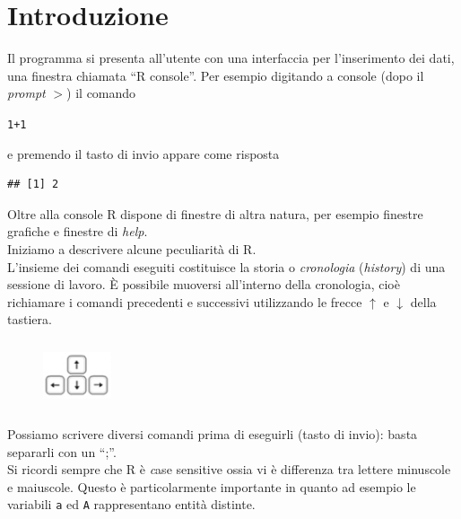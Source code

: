 \documentclass[onecolumn,11pt]{book}\usepackage[]{graphicx}\usepackage[]{color}
\makeatletter
\newcommand{\hlnum}[1]{\textcolor[rgb]{0.686,0.059,0.569}{#1}}%
\newcommand{\hlopt}[1]{\textcolor[rgb]{0,0,0}{#1}}%
\newenvironment{kframe}{%
 \def\at@end@of@kframe{}%
 \ifinner\ifhmode%
  \def\at@end@of@kframe{\end{minipage}}%
  \begin{minipage}{\columnwidth}%
 \fi\fi%
 \def\FrameCommand##1{\hskip\@totalleftmargin \hskip-\fboxsep
 \colorbox{shadecolor}{##1}\hskip-\fboxsep
     \hskip-\linewidth \hskip-\@totalleftmargin \hskip\columnwidth}%
 \MakeFramed {\advance\hsize-\width
   \@totalleftmargin\z@ \linewidth\hsize
   \@setminipage}}%
 {\par\unskip\endMakeFramed%
 \at@end@of@kframe}
\newenvironment{knitrout}{}{} %
\makeatother
\begin{document}
\section{Introduzione}
Il programma si presenta all'utente con una interfaccia per l'inserimento dei dati, una finestra chiamata ``\textsf{R} console''. Per esempio digitando a console (dopo il \textit{prompt} $>$) il comando
\begin{knitrout}
\color{fgcolor}\begin{kframe}
\begin{alltt}
\hlnum{1}\hlopt{+}\hlnum{1}
\end{alltt}
\end{kframe}
\end{knitrout}
e premendo il tasto di invio appare come risposta
\begin{knitrout}
\color{fgcolor}\begin{kframe}
\begin{verbatim}
## [1] 2
\end{verbatim}
\end{kframe}
\end{knitrout}
Oltre alla console
\textsf{R} dispone di finestre di altra natura, per esempio finestre grafiche e finestre di {\it help}.
\\
Iniziamo a descrivere alcune peculiarit\`a di \textsf{R}.\\
L'insieme dei comandi eseguiti costituisce la storia o \textit{cronologia} (\textit{history}) 
 di una sessione di lavoro. \`E possibile muoversi all'interno della cronologia, cio\`e richiamare i comandi precedenti e successivi utilizzando le frecce $\uparrow$ e $\downarrow$ della tastiera.\\
\begin{figure}
     \includegraphics[height=20mm,width=20mm]{../grafici/Tastisugiu.png}
 \vspace{-20pt}
\end{figure}

Possiamo scrivere diversi comandi prima di eseguirli (tasto di invio): basta separarli con un  ``;''.\\
Si ricordi sempre che \textsf{R} \`e {\emph case sensitive} ossia vi \`e differenza tra lettere minuscole e maiuscole.  Questo \`e particolarmente importante in quanto ad esempio le variabili \texttt{a} ed \texttt{A} rappresentano entit\`a distinte.
\end{document}
